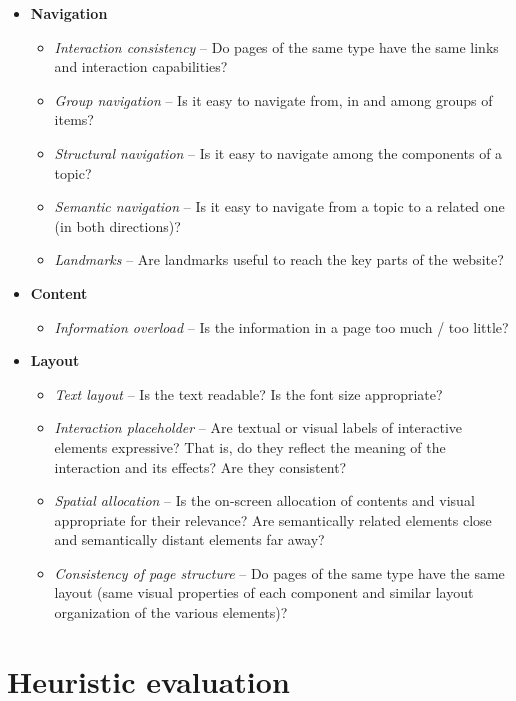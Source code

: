 \documentclass[a4paper, 11pt, parskip=half, headsepline]{scrreprt}
\begin{document}
\begin{itemize}
    \item \textbf{Navigation}
    \begin{itemize}
        \item \textit{Interaction consistency} -- Do pages of the same type have the same links and interaction capabilities?
        \item \textit{Group navigation} -- Is it easy to navigate from, in and among groups of items?
        \item \textit{Structural navigation} -- Is it easy to navigate among the components of a topic?
        \item \textit{Semantic navigation} -- Is it easy to navigate from a topic to a related one (in both directions)?
        \item \textit{Landmarks} -- Are landmarks useful to reach the key parts of the website?
    \end{itemize}
    \item \textbf{Content}
    \begin{itemize}
        \item \textit{Information overload} -- Is the information in a page too much / too little?
    \end{itemize}
    \item \textbf{Layout}
    \begin{itemize}
        \item \textit{Text layout} -- Is the text readable? Is the font size appropriate?
        \item \textit{Interaction placeholder} -- Are textual or visual labels of interactive elements expressive? That is, do they reflect the meaning of the interaction and its effects? Are they consistent?
        \item \textit{Spatial allocation} -- Is the on-screen allocation of contents and visual appropriate for their relevance? Are semantically related elements close and semantically distant elements far away?
        \item \textit{Consistency of page structure} -- Do pages of the same type have the same layout (same visual properties of each component and similar layout organization of the various elements)?
    \end{itemize}
\end{itemize}




\chapter{Heuristic evaluation}
\label{chapter:evaluation}
\end{document}
